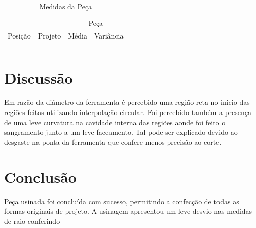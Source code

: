 \documentclass[a4paper,11pt]{article}
\begin{document}
\begin{table}[H]
    \centering
    \begin{tabular}{cccc}
    \hline
        & & \multicolumn{2}{c}{Peça}\\
        Posição & Projeto & Média & Variância\\
    \hline
         & & &\\
         & & &\\
    \hline
    \end{tabular}
    \caption{Medidas da Peça}
    \label{tab:my_label}
\end{table}

\section{Discussão}
 Em razão da diâmetro da ferramenta é percebido uma região reta no inicio das regiões feitas utilizando interpolação circular. Foi percebido também a presença de uma leve curvatura na cavidade interna das regiões aonde foi feito o sangramento junto a um leve faceamento. Tal pode ser explicado devido ao desgaste na ponta da ferramenta que confere menos precisão ao corte.

\section{Conclusão}
Peça usinada foi concluída com sucesso, permitindo a confecção de todas as formas originais de projeto. A usinagem apresentou um leve desvio nas medidas de raio conferindo











\end{document}
